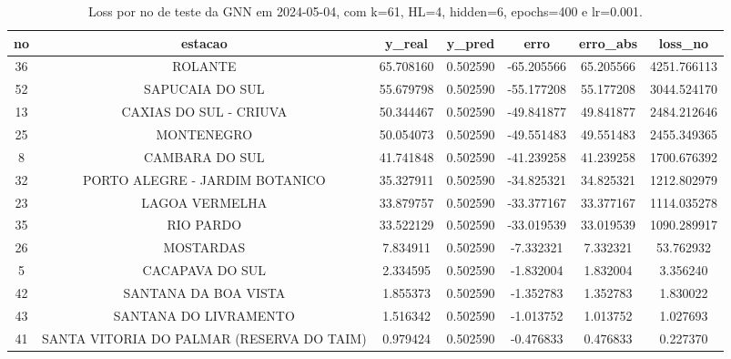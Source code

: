 \begin{table}[h]
\centering
\caption{Loss por no de teste da GNN em 2024-05-04, com k=61, HL=4, hidden=6, epochs=400 e lr=0.001.}
\label{tab:gnn_loss_k61_hl4_h6_e400_d20240504}
\begin{tabular}{ccccccc}
\toprule
no & estacao & y\_real & y\_pred & erro & erro\_abs & loss\_no \\
\midrule
36 & ROLANTE & 65.708160 & 0.502590 & -65.205566 & 65.205566 & 4251.766113 \\
52 & SAPUCAIA DO SUL & 55.679798 & 0.502590 & -55.177208 & 55.177208 & 3044.524170 \\
13 & CAXIAS DO SUL - CRIUVA & 50.344467 & 0.502590 & -49.841877 & 49.841877 & 2484.212646 \\
25 & MONTENEGRO & 50.054073 & 0.502590 & -49.551483 & 49.551483 & 2455.349365 \\
8 & CAMBARA DO SUL & 41.741848 & 0.502590 & -41.239258 & 41.239258 & 1700.676392 \\
32 & PORTO ALEGRE - JARDIM BOTANICO & 35.327911 & 0.502590 & -34.825321 & 34.825321 & 1212.802979 \\
23 & LAGOA VERMELHA & 33.879757 & 0.502590 & -33.377167 & 33.377167 & 1114.035278 \\
35 & RIO PARDO & 33.522129 & 0.502590 & -33.019539 & 33.019539 & 1090.289917 \\
26 & MOSTARDAS & 7.834911 & 0.502590 & -7.332321 & 7.332321 & 53.762932 \\
5 & CACAPAVA DO SUL & 2.334595 & 0.502590 & -1.832004 & 1.832004 & 3.356240 \\
42 & SANTANA DA BOA VISTA & 1.855373 & 0.502590 & -1.352783 & 1.352783 & 1.830022 \\
43 & SANTANA DO LIVRAMENTO & 1.516342 & 0.502590 & -1.013752 & 1.013752 & 1.027693 \\
41 & SANTA VITORIA DO PALMAR (RESERVA DO TAIM) & 0.979424 & 0.502590 & -0.476833 & 0.476833 & 0.227370 \\
\bottomrule
\end{tabular}
\end{table}
